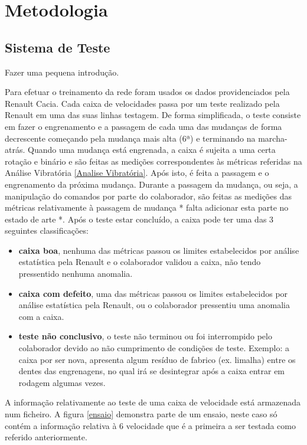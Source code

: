 

\chapter{Metodologia}
\label{chapter:metodolia}




\section{Sistema de Teste}


Fazer uma pequena introdução.

Para efetuar o treinamento da rede foram usados os dados providenciados pela Renault Cacia.
	Cada caixa de velocidades passa por um teste realizado pela Renault em uma das suas linhas testagem. De forma simplificada, o teste consiste em fazer o engrenamento e a passagem de cada uma das mudanças de forma decrescente começando pela mudança mais alta (6ª) e terminando na marcha-atrás. Quando uma mudança está engrenada, a caixa é sujeita a uma certa rotação e binário e são feitas as medições correspondentes às métricas referidas na Análise Vibratória \ref{Analise Vibratória}. Após isto, é feita a passagem e o engrenamento da próxima mudança. Durante a passagem da mudança, ou seja, a manipulação do comandos por parte do colaborador, são feitas as medições das métricas relativamente à passagem de mudança * falta adicionar esta parte no estado de arte *. Após o teste estar concluído, a caixa pode ter uma das 3 seguintes classificações: 
\begin{itemize}
\item \textbf{caixa  boa}, nenhuma das métricas passou os limites estabelecidos por análise estatística pela Renault e o colaborador validou a caixa, não tendo pressentido nenhuma anomalia.
\item \textbf{caixa com defeito}, uma das métricas passou os limites estabelecidos por análise estatística pela Renault, ou o colaborador pressentiu uma anomalia com a caixa.
\item \textbf{teste não conclusivo}, o teste não terminou ou foi interrompido pelo colaborador devido ao não cumprimento de condições de teste. Exemplo: a caixa por ser nova, apresenta algum resíduo de fabrico (ex. limalha) entre os dentes das engrenagens, no qual irá se desintegrar após a caixa entrar em rodagem algumas vezes. 
\end{itemize}

A informação relativamente ao teste de uma caixa de velocidade está armazenada num ficheiro. A figura \ref{ensaio} demonstra parte de um ensaio, neste caso só contém a informação relativa à 6 velocidade que é a primeira a ser testada como referido anteriormente.


